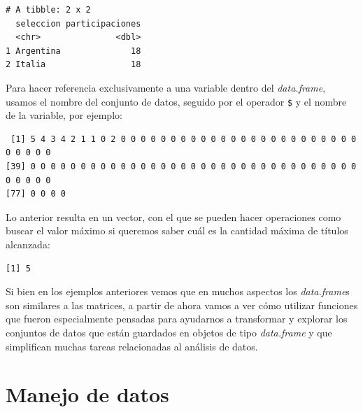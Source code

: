 \documentclass[
]{book}
\newenvironment{Shaded}{\begin{snugshade}}{\end{snugshade}}
\newcommand{\FunctionTok}[1]{\textcolor[rgb]{0.00,0.00,0.00}{#1}}
\newcommand{\NormalTok}[1]{#1}
\newcommand{\SpecialCharTok}[1]{\textcolor[rgb]{0.00,0.00,0.00}{#1}}
\begin{document}
\begin{verbatim}
# A tibble: 2 x 2
  seleccion participaciones
  <chr>               <dbl>
1 Argentina              18
2 Italia                 18
\end{verbatim}

Para hacer referencia exclusivamente a una variable dentro del \emph{data.frame}, usamos el nombre del conjunto de datos, seguido por el operador \texttt{\$} y el nombre de la variable, por ejemplo:

\begin{Shaded}
\end{Shaded}

\begin{verbatim}
 [1] 5 4 3 4 2 1 1 0 2 0 0 0 0 0 0 0 0 0 0 0 0 0 0 0 0 0 0 0 0 0 0 0 0 0 0 0 0 0
[39] 0 0 0 0 0 0 0 0 0 0 0 0 0 0 0 0 0 0 0 0 0 0 0 0 0 0 0 0 0 0 0 0 0 0 0 0 0 0
[77] 0 0 0 0
\end{verbatim}

Lo anterior resulta en un vector, con el que se pueden hacer operaciones como buscar el valor máximo si queremos saber cuál es la cantidad máxima de títulos alcanzada:

\begin{Shaded}
\end{Shaded}

\begin{verbatim}
[1] 5
\end{verbatim}

Si bien en los ejemplos anteriores vemos que en muchos aspectos los \emph{data.frame}s son similares a las matrices, a partir de ahora vamos a ver cómo utilizar funciones que fueron especialmente pensadas para ayudarnos a transformar y explorar los conjuntos de datos que están guardados en objetos de tipo \emph{data.frame} y que simplifican muchas tareas relacionadas al análisis de datos.

\hypertarget{manejo-de-datos}{%
\section{Manejo de datos}\label{manejo-de-datos}}
\end{document}
